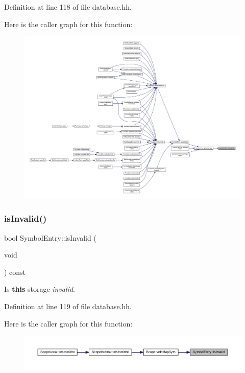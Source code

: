 Definition at line 118 of file database.\+hh.

Here is the caller graph for this function\+:
\nopagebreak
\begin{figure}[H]
\begin{center}
\leavevmode
\includegraphics[width=350pt]{class_symbol_entry_a30c4c7a954f6d5d4bc0e50d78b16077e_icgraph}
\end{center}
\end{figure}
\mbox{\label{class_symbol_entry_ab519054ccea76aae98ec280ab051a6ea}} 
\subsubsection{\texorpdfstring{isInvalid()}{isInvalid()}}
{\footnotesize\ttfamily bool Symbol\+Entry\+::is\+Invalid (\begin{DoxyParamCaption}\item[{void}]{ }\end{DoxyParamCaption}) const\hspace{0.3cm}{\ttfamily [inline]}}



Is {\bfseries{this}} storage {\itshape invalid}. 



Definition at line 119 of file database.\+hh.

Here is the caller graph for this function\+:
\nopagebreak
\begin{figure}[H]
\begin{center}
\leavevmode
\includegraphics[width=350pt]{class_symbol_entry_ab519054ccea76aae98ec280ab051a6ea_icgraph}
\end{center}
\end{figure}
\mbox{\label{class_symbol_entry_a13c0e084b4c66443250ecf145f43d2e2}} 
